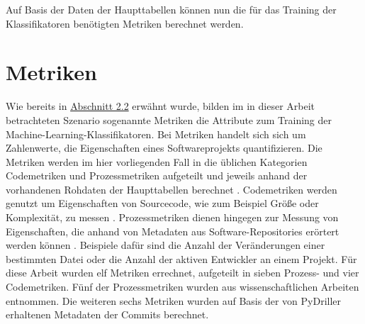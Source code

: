 Auf Basis der Daten der Haupttabellen können nun die für das Training der Klassifikatoren benötigten Metriken berechnet werden.

\section{Metriken}

Wie bereits in \hyperref[classification]{Abschnitt 2.2} erwähnt wurde, bilden im in dieser Arbeit betrachteten Szenario sogenannte Metriken die Attribute zum Training der Machine-Learning-Klassifikatoren. Bei Metriken handelt sich sich um Zahlenwerte, die Eigenschaften eines Softwareprojekts quantifizieren. Die Metriken werden im hier vorliegenden Fall in die üblichen Kategorien Codemetriken und Prozessmetriken aufgeteilt und jeweils anhand der vorhandenen Rohdaten der Haupttabellen berechnet \cite{Rahman2013}. Codemetriken werden genutzt um Eigenschaften von Sourcecode, wie zum Beispiel \glqq Größe\grqq{} oder Komplexität, zu messen \cite{Rahman2013}. Prozessmetriken dienen hingegen zur Messung von Eigenschaften, die anhand von Metadaten aus Software-Repositories erörtert werden können \cite{Rahman2013}. Beispiele dafür sind die Anzahl der Veränderungen einer bestimmten Datei oder die Anzahl der aktiven Entwickler an einem Projekt. Für diese Arbeit wurden elf Metriken errechnet, aufgeteilt in sieben Prozess- und vier Codemetriken. Fünf der Prozessmetriken wurden aus wissenschaftlichen Arbeiten \cite{Rahman2013,Queiroz2016} entnommen. Die weiteren sechs Metriken wurden auf Basis der von PyDriller erhaltenen Metadaten der Commits berechnet.

